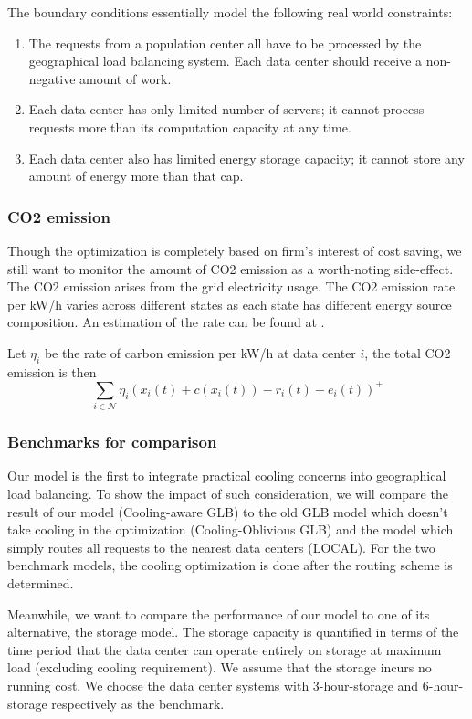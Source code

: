\documentclass{acm_proc_article-sp}
\begin{document}
The boundary conditions essentially model the following real world constraints:
\begin{enumerate}
\item
The requests from a population center all have to be processed by the geographical load balancing system. Each data center should receive a non-negative amount of work.
\item
Each data center has only limited number of servers; it cannot process requests more than its computation capacity at any time.
\item
Each data center also has limited energy storage capacity; it cannot store any amount of energy more than that cap.
\end{enumerate}
\subsubsection{CO2 emission}
Though the optimization is completely based on firm's interest of cost saving, we still want to monitor the amount of CO2 emission as a worth-noting side-effect. The CO2 emission arises from the grid electricity usage. The CO2 emission rate per kW/h varies across different states as each state has different energy source composition. An estimation of the rate can be found at \cite{carbon}.

Let $\eta_i$ be the rate of carbon emission per kW/h at data center $i$, the total CO2 emission is then
$$\sum_{i \in \mathcal{N}} \eta_i(x_i(t) + c(x_i(t)) - r_i(t) - e_i(t))^+$$ 
\subsubsection{Benchmarks for comparison}
Our model is the first to integrate practical cooling concerns into geographical load balancing. To show the impact of such consideration, we will compare the result of our model (Cooling-aware GLB) to the old GLB model which doesn't take cooling in the optimization (Cooling-Oblivious GLB) and the model which simply routes all requests to the nearest data centers (LOCAL). For the two benchmark models, the cooling optimization is done after the routing scheme is determined.

Meanwhile, we want to compare the performance of our model to one of its alternative, the storage model. The storage capacity is quantified in terms of the time period that the data center can operate entirely on storage at maximum load (excluding cooling requirement). We assume that the storage incurs no running cost. We choose the data center systems with 3-hour-storage and 6-hour-storage respectively as the benchmark. 
\end{document}
